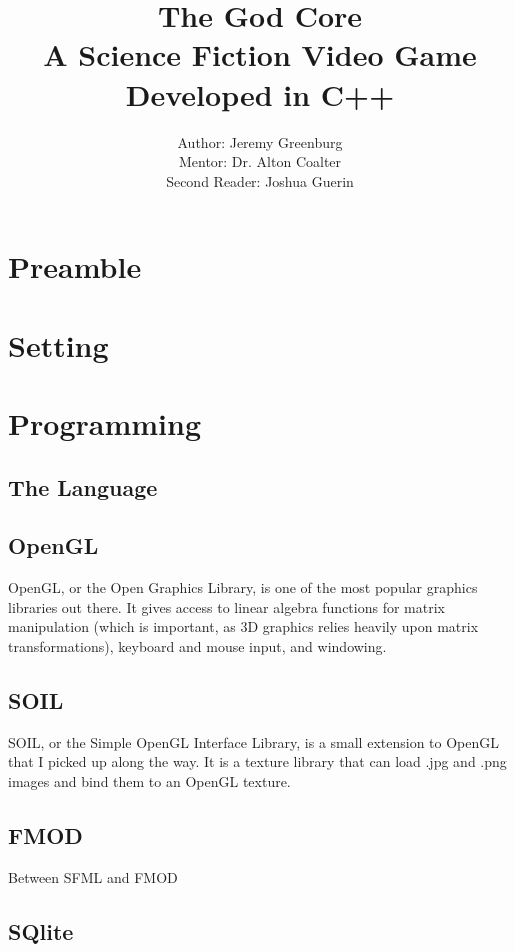 \documentclass{article}
\author{Author: Jeremy Greenburg \\ Mentor: Dr. Alton Coalter \\ Second Reader: Joshua Guerin}
\title{The God Core \\ A Science Fiction Video Game Developed in C++}
\begin{document}
\maketitle
\pagebreak

\tableofcontents

\pagebreak

\section{Preamble}

\section{Setting}

\section{Programming}

\subsection{The Language}

\subsection{OpenGL}
OpenGL, or the Open Graphics Library, is one of the most popular graphics libraries out there. It gives access to linear algebra functions for matrix manipulation (which is important, as 3D graphics relies heavily upon matrix transformations), keyboard and mouse input, and windowing. 

\subsection{SOIL}
SOIL, or the Simple OpenGL Interface Library, is a small extension to OpenGL that I picked up along the way. It is a texture library that can load .jpg and .png images and bind them to an OpenGL texture.

\subsection{FMOD}
Between SFML and FMOD

\subsection{SQlite}
\end{document}
